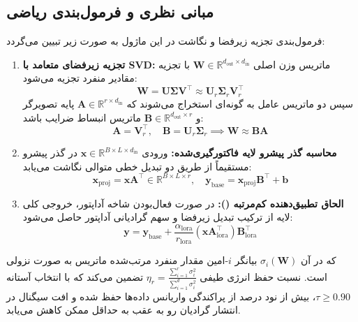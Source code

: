 \subsection{مبانی نظری و فرمول‌بندی ریاضی}
فرمول‌بندی تجزیه زیرفضا و نگاشت در این ماژول به صورت زیر تبیین می‌گردد:
\begin{enumerate}
    \item \textbf{تجزیه زیرفضای متعامد با SVD:}
    ماتریس وزن اصلی $\mathbf{W} \in \mathbb{R}^{d_{\text{out}} \times d_{\text{in}}}$ با تجزیه مقادیر منفرد تجزیه می‌شود:
    \begin{equation}
    \mathbf{W} = \mathbf{U} \boldsymbol{\Sigma} \mathbf{V}^\top \approx \mathbf{U}_r \boldsymbol{\Sigma}_r \mathbf{V}_r^\top
    \end{equation}
    سپس دو ماتریس عامل به گونه‌ای استخراج می‌شوند که $\mathbf{A} \in \mathbb{R}^{r \times d_{\text{in}}}$ پایه تصویرگر و $\mathbf{B} \in \mathbb{R}^{d_{\text{out}} \times r}$ ماتریس انبساط ضرایب باشد:
    \begin{equation}
    \mathbf{A} = \mathbf{V}_r^\top, \quad \mathbf{B} = \mathbf{U}_r \boldsymbol{\Sigma}_r \implies \mathbf{W} \approx \mathbf{B} \mathbf{A}
    \end{equation}
    \item \textbf{محاسبه گذر پیشرو لایه فاکتورگیری‌شده:}
    ورودی $\mathbf{x} \in \mathbb{R}^{B \times L \times d_{\text{in}}}$ در گذر پیشرو مستقیماً از طریق دو تبدیل خطی متوالی نگاشت می‌یابد:
    \begin{equation}
    \mathbf{x}_{\text{proj}} = \mathbf{x} \mathbf{A}^\top \in \mathbb{R}^{B \times L \times r}, \quad \mathbf{y}_{\text{base}} = \mathbf{x}_{\text{proj}} \mathbf{B}^\top + \mathbf{b}
    \end{equation}
    \item \textbf{الحاق تطبیق‌دهنده کم‌مرتبه ():}
    در صورت فعال‌بودن شاخه آداپتور، خروجی کلی لایه از ترکیب تبدیل زیرفضا و سهم گرادیانی آداپتور حاصل می‌شود:
    \begin{equation}
    \mathbf{y} = \mathbf{y}_{\text{base}} + \frac{\alpha_{\text{lora}}}{r_{\text{lora}}} (\mathbf{x} \mathbf{A}_{\text{lora}}^\top) \mathbf{B}_{\text{lora}}^\top
    \end{equation}
\end{enumerate}

که در آن $\sigma_i(\mathbf{W})$ بیانگر $i$-امین مقدار منفرد مرتب‌شده ماتریس به صورت نزولی است. نسبت حفظ انرژی طیفی $\eta_r = \frac{\sum_{i=1}^r \sigma_i^2}{\sum_{i=1}^{d} \sigma_i^2}$ تضمین می‌کند که با انتخاب آستانه $\tau \ge 0.90$، بیش از نود درصد از پراکندگی واریانس داده‌ها حفظ شده و افت سیگنال در انتشار گرادیان رو به عقب به حداقل ممکن کاهش می‌یابد.

